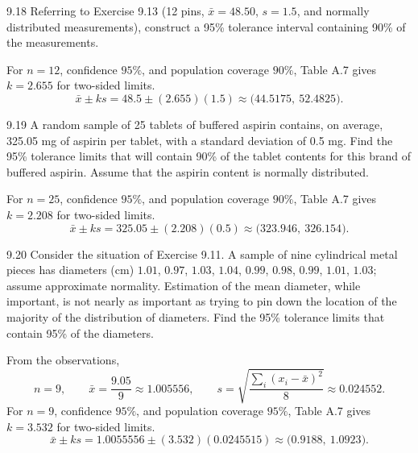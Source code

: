 \documentclass[11pt,oneside]{article}
\begin{document}
\begin{exercise}{9.18}
Referring to Exercise 9.13 (12 pins, $\bar x=48.50$, $s=1.5$, and normally distributed measurements), construct a 95\% tolerance interval containing 90\% of the measurements.
\end{exercise}
\begin{solution}
For $n=12$, confidence $95\%$, and population coverage $90\%$, Table A.7 gives $k=2.655$ for two-sided limits.
\[
\bar x\pm ks=48.5\pm(2.655)(1.5)\approx\boxed{\bigl(44.5175,\ 52.4825\bigr)}.
\]
\end{solution}

\begin{exercise}{9.19}
A random sample of 25 tablets of buffered aspirin contains, on average, 325.05 mg of aspirin per tablet, with a standard deviation of 0.5 mg. Find the 95\% tolerance limits that will contain 90\% of the tablet contents for this brand of buffered aspirin. Assume that the aspirin content is normally distributed.
\end{exercise}
\begin{solution}
For $n=25$, confidence $95\%$, and population coverage $90\%$, Table A.7 gives $k=2.208$ for two-sided limits.
\[
\bar x\pm ks=325.05\pm(2.208)(0.5)\approx\boxed{\bigl(323.946,\ 326.154\bigr)}.
\]
\end{solution}

\begin{exercise}{9.20}
Consider the situation of Exercise 9.11. A sample of nine cylindrical metal pieces has diameters (cm) $1.01$, $0.97$, $1.03$, $1.04$, $0.99$, $0.98$, $0.99$, $1.01$, $1.03$; assume approximate normality. Estimation of the mean diameter, while important, is not nearly as important as trying to pin down the location of the majority of the distribution of diameters. Find the 95\% tolerance limits that contain 95\% of the diameters.
\end{exercise}
\begin{solution}
From the observations, 
\[
n=9,\qquad\bar x=\frac{9.05}{9}\approx1.005556,\qquad s=\sqrt{\frac{\sum_i(x_i-\bar x)^2}{8}}\approx0.024552.
\]
For $n=9$, confidence $95\%$, and population coverage $95\%$, Table A.7 gives $k=3.532$ for two-sided limits.
\[
\bar x\pm ks=1.0055556\pm(3.532)(0.0245515)\approx\boxed{\bigl(0.9188,\ 1.0923\bigr)}.
\]
\end{solution}
\end{document}
